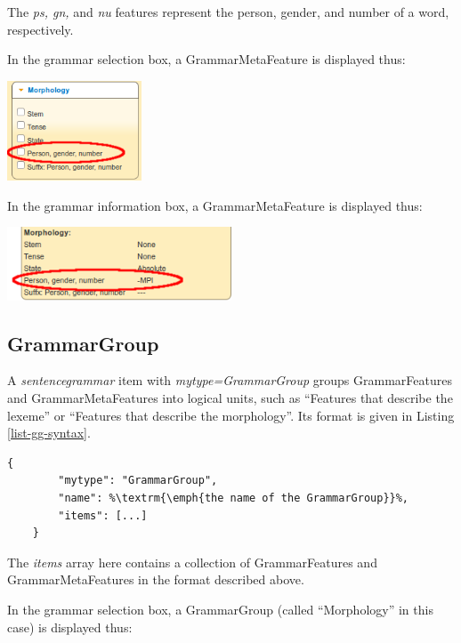 \documentclass[11pt,oneside,a4paper]{memoir}
\begin{document}
The \emph{ps, gn,} and \emph{nu} features represent the person, gender, and number of a word,
respectively.


\Needspace*{5cm}%
In the grammar selection box, a GrammarMetaFeature is displayed thus:

\begin{center}
  \includegraphics[width=0.3\textwidth]{pgn1.png}
\end{center}

\Needspace*{5cm}%
In the grammar information box, a GrammarMetaFeature is displayed thus:

\begin{center}
  \includegraphics[width=0.5\textwidth]{pgn2.png}
\end{center}


\subsection{GrammarGroup}\label{sec-grammargroup}

A \emph{sentencegrammar} item with \emph{mytype=GrammarGroup} groups GrammarFeatures and
GrammarMetaFeatures into logical units, such as ``Features that describe the lexeme'' or ``Features
that describe the morphology''. Its format is given in Listing \ref{list-gg-syntax}.

\begin{lstlisting}[caption=GrammarGroup syntax,label=list-gg-syntax]
    {
        "mytype": "GrammarGroup",
        "name": %\textrm{\emph{the name of the GrammarGroup}}%,
        "items": [...]
    }
\end{lstlisting}

The \emph{items} array here contains a collection of GrammarFeatures and GrammarMetaFeatures in the
format described above.

\Needspace*{5cm}%
In the grammar selection box, a GrammarGroup (called ``Morphology'' in
this case) is displayed thus:
\end{document}
